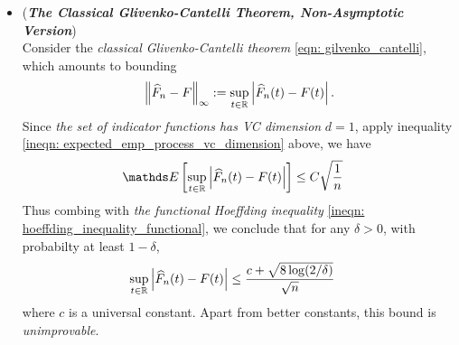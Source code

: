 \documentclass[11pt]{article}
\begin{document}
\begin{itemize}
\item \begin{remark} (\textbf{\emph{The Classical Glivenko-Cantelli Theorem, Non-Asymptotic Version}})\\
Consider the \emph{classical Glivenko-Cantelli theorem} \eqref{eqn: gilvenko_cantelli}, which amounts to bounding
\begin{align*}
\left\|\widehat{F}_n - F\right\|_{\infty} :=  \sup_{t\in {\mathbb R}}\left\lvert \widehat{F}_n(t) - F(t) \right\rvert.
\end{align*}
Since \emph{the set of indicator functions has VC dimension} $d = 1$, apply inequality \eqref{ineqn: expected_emp_process_vc_dimension} above, we have
\begin{align}
\E{}{ \sup_{t\in \bR}\abs{\widehat{F}_n(t) - F(t)}} &\le C\sqrt{\frac{1}{n}} \label{ineqn: gilvenko_cantelli_expected_value}
\end{align} Thus combing with  \emph{the functional Hoeffding inequality} \eqref{ineqn: hoeffding_inequality_functional}, we conclude that for any $\delta >0$, with probabilty at least $1-\delta$, 
\begin{align}
 \sup_{t\in {\mathbb R}}\left\lvert \widehat{F}_n(t) - F(t) \right\rvert &\le  \frac{c + \sqrt{8 \log(2/\delta)}}{\sqrt{n}}  \label{ineqn: gilvenko_cantelli}
\end{align} where $c$ is a universal constant. Apart from better constants, this bound is \emph{unimprovable}.
\end{remark}
\end{itemize}




\newpage


\end{document}
